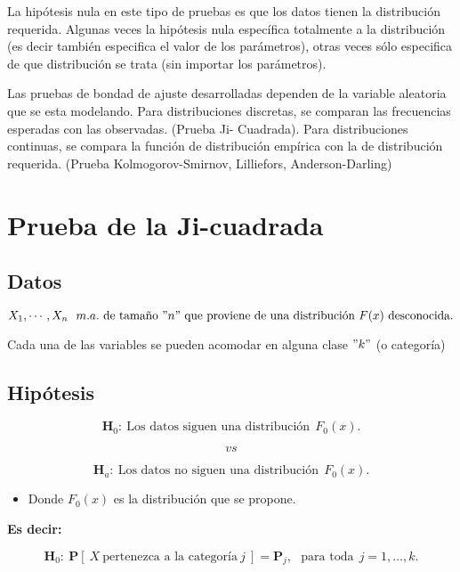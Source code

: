 \documentclass[
  a4paper,
  oneside,
  openany]{book}
\providecommand{\tightlist}{%
  \setlength{\itemsep}{0pt}\setlength{\parskip}{0pt}}
\begin{document}
La hipótesis nula en este tipo de pruebas es que los datos tienen la distribución requerida. Algunas veces la hipótesis nula específica totalmente a la distribución (es decir también especifica el valor de los parámetros), otras veces sólo especifica de que distribución se trata (sin importar los parámetros).

Las pruebas de bondad de ajuste desarrolladas dependen de la variable aleatoria que se esta modelando. Para distribuciones discretas, se comparan las frecuencias esperadas con las observadas. (Prueba Ji-
Cuadrada). Para distribuciones continuas, se compara la función de distribución empírica con la de distribución requerida. (Prueba Kolmogorov-Smirnov, Lilliefors, Anderson-Darling)

\hypertarget{prueba-de-la-ji-cuadrada}{%
\chapter{Prueba de la Ji-cuadrada}\label{prueba-de-la-ji-cuadrada}}

\hypertarget{datos-14}{%
\section{Datos}\label{datos-14}}

\[X_{1},\cdots,X_{n} \ \ m.a. \  \mbox{de tamaño} \  "n"\  \mbox{que proviene de una distribución} \  F(x) \  \mbox{desconocida.}\]

Cada una de las variables se pueden acomodar en alguna clase \("k"\) (o categoría)

\hypertarget{hipuxf3tesis-13}{%
\section{Hipótesis}\label{hipuxf3tesis-13}}

\[\textbf{H}_0: \ \mbox{Los datos siguen una distribución} \ \  F_{0}(x).\]

\[vs\]

\[\textbf{H}_a: \ \mbox{Los datos no siguen una distribución} \ \ F_{0}(x).\]

\begin{itemize}
\tightlist
\item
  Donde \(F_{0}(x)\) es la distribución que se propone.
\end{itemize}

\textbf{Es decir:}

\[\textbf{H}_0: \ \mathbf{P}[\ X \ \mbox{pertenezca a la categoría} \ j \ ] = \mathbf{P}_{j},\ \ \ \mbox{para toda} \ \  j=1,\ldots,k.\]
\end{document}
